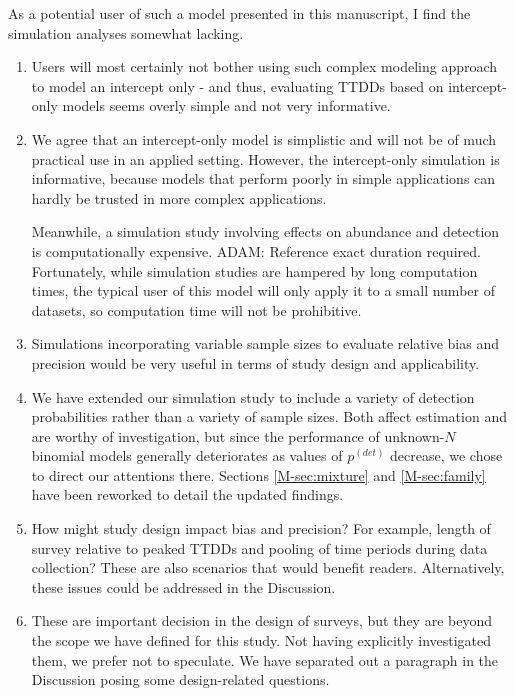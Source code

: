 \documentclass[12pt]{article}
\renewenvironment{quote}  %
              {\list{}{\rightmargin\leftmargin}\normalfont%
               \item\relax}
              {\endlist}
\newcommand{\adam}[1]{{\color{blue} ADAM: #1}}
\newcommand{\pdet}{p^{(det)}}
\begin{document}
As a potential user of such a model presented in this manuscript, I find the simulation analyses somewhat lacking.   
\begin{enumerate}
\item Users will most certainly not bother using such complex modeling approach to model an intercept only - and thus, evaluating TTDDs based on intercept-only models seems overly simple and not very informative. \begin{quote}
We agree that an intercept-only model is simplistic and will not be of much practical use in an applied setting.
However, the intercept-only simulation is informative, because models that perform poorly in simple applications can hardly be trusted in more complex applications.

Meanwhile, a simulation study involving effects on abundance and detection is computationally expensive. \adam{Reference exact duration required}.
Fortunately, while simulation studies are hampered by long computation times, the typical user of this model will only apply it to a small number of datasets, so computation time will not be prohibitive.
\end{quote}

\item Simulations incorporating variable sample sizes to evaluate relative bias and precision would be very useful in terms of study design and applicability.  
\begin{quote}
We have extended our simulation study to include a variety of detection probabilities rather than a variety of sample sizes.
Both affect estimation and are worthy of investigation, but since the performance of unknown-$N$ binomial models generally deteriorates as values of $\pdet$ decrease, we chose to direct our attentions there.
Sections \ref{M-sec:mixture} and \ref{M-sec:family} have been reworked to detail the updated findings.
\end{quote}

\item How might study design impact bias and precision?  For example, length of survey relative to peaked TTDDs and pooling of time periods during data collection?  These are also scenarios that would benefit readers.  Alternatively, these issues could be addressed in the Discussion.
\begin{quote}
These are important decision in the design of surveys, but they are beyond the scope we have defined for this study.
Not having explicitly investigated them, we prefer not to speculate.
We have separated out a paragraph in the Discussion posing some design-related questions.
\end{quote}


\end{enumerate}
\end{document}
